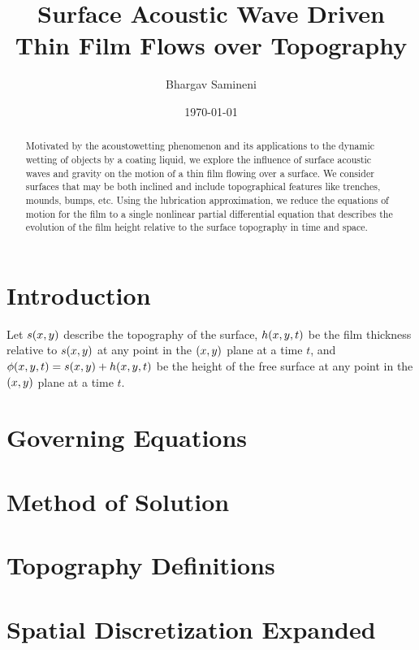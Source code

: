 \documentclass[letterpaper]{article}
\title{Surface Acoustic Wave Driven Thin Film Flows over Topography}
\author{Bhargav Samineni}
\date{\today}
\begin{document}
 
\maketitle

\begin{abstract}
    Motivated by the acoustowetting phenomenon and its applications to the dynamic wetting 
    of objects by a coating liquid, we explore the influence of surface acoustic waves and gravity on the motion of a thin film
    flowing over a surface. We consider surfaces that may be both inclined and include topographical features like trenches, mounds, bumps, etc. 
    Using the lubrication approximation, we reduce the equations of motion for the film
    to a single nonlinear partial differential equation that describes the evolution of the film height relative to the 
    surface topography in time and space. 
\end{abstract}

\dosecttoc
\tableofcontents

\section{Introduction}

Let $s\!\left( x, y \right)$ describe the topography of the surface, 
$h\!\left( x,y,t \right)$ be the film thickness relative to $s\!\left( x,y \right)$ at any point in the $\left( x,y \right)$ plane at a time $t$, 
and $\phi\!\left( x,y,t \right) = s\!\left( x,y \right) + h\!\left( x,y,t \right)$ be the height of the free surface at any point in the $\left( x,y \right)$ plane at a time $t$.

\section{Governing Equations} \label{sec:gov_eqs}

 
\section{Method of Solution} \label{sec:method_of_sol}


 
\newpage
\begin{appendices}
    \section{Topography Definitions} \label{sec:topography}

    \section{Spatial Discretization Expanded}\label{sec:space_discrete_expand}
    
\end{appendices}

\newpage
\printbibliography
\end{document}
